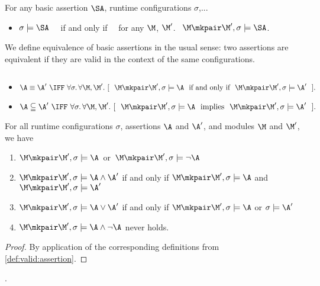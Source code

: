 \begin{lemma}
For any basic assertion $\SA$, runtime configurations $\sigma$,...
\begin{itemize}
\item $\sigma \models \SA$ \ \ if and only if \ \  for any $\M$, $\M'$. \, $\M\mkpair \M', \sigma \models\SA$.
\end{itemize}

\end{lemma}

We define equivalence of basic assertions in the usual sense: two assertions are equivalent if they are valid in 
the context of the same configurations.

\begin{definition} 
$ ~ $ 

\begin{itemize}
\item
$\A \equiv \A'\  \IFF\    \forall \sigma.\, \forall \M, \M'. \ [\ \ \M\mkpair \M', \sigma \models \A\ \mbox{ if and only if }\ \M\mkpair \M', \sigma \models \A'\ \ ].$
\item
$\A \subseteqq \A'\  \IFF\    \forall \sigma.\, \forall \M, \M'. \ [\ \ \M\mkpair \M', \sigma \models \A\ \mbox{ implies }\ \M\mkpair \M', \sigma \models \A'\ \ ].$
\end{itemize}
\end{definition}

 

\begin{lemma}
For all runtime configurations $\sigma$,    assertions $\A$ and $\A'$, and modules $\M$  and $\M'$, we have
\begin{enumerate}
\item 
$\M\mkpair \M', \sigma \models \A$\ or\ $\M\mkpair \M', \sigma \models \neg\A$
\item
$\M\mkpair \M', \sigma  \models \A \wedge \A'$ \SP if and only if \SP $\M\mkpair \M', \sigma \models \A$ and $\M\mkpair \M', \sigma  \models \A'$ 
\item
$\M\mkpair \M', \sigma  \models \A \vee \A'$ \SP if and only if \SP $\M\mkpair \M', \sigma  \models \A$ or  $\sigma \models \A'$ 
\item
$\M\mkpair \M', \sigma  \models \A \wedge \neg\A$ never holds.
\end{enumerate}
\end{lemma}
\begin{proof} By application of the corresponding definitions from \ref{def:valid:assertion}.\end{proof}.

